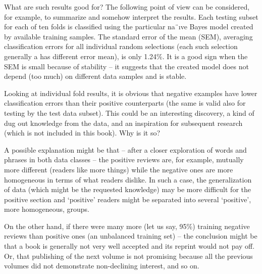 What are such results good for? The following point of view can be considered, for example, to summarize and somehow interpret the results. Each testing
subset for each of ten folds is classified using the particular na¨ıve Bayes model
created by available training samples. The standard error of the mean (SEM),
averaging classification errors for all individual random selections (each such
selection generally a has different error mean), is only 1.24\%. It is a good sign
when the SEM is small because of stability – it suggests that the created model
does not depend (too much) on different data samples and is stable.

Looking at individual fold results, it is obvious that negative examples have
lower classification errors than their positive counterparts (the same is valid also
for testing by the test data subset). This could be an interesting discovery, a kind
of dug out knowledge from the data, and an inspiration for subsequent research
(which is not included in this book). Why is it so?

A possible explanation might be that – after a closer exploration of words
and phrases in both data classes – the positive reviews are, for example, mutually more different (readers like more things) while the negative ones are more
homogeneous in terms of what readers dislike. In such a case, the generalization
of data (which might be the requested knowledge) may be more difficult for the
positive section and ‘positive’ readers might be separated into several ‘positive’,
more homogeneous, groups.

On the other hand, if there were many more (let us say, 95\%) training negative
reviews than positive ones (an unbalanced training set) – the conclusion might be
that a book is generally not very well accepted and its reprint would not pay off.
Or, that publishing of the next volume is not promising because all the previous
volumes did not demonstrate non-declining interest, and so on.





